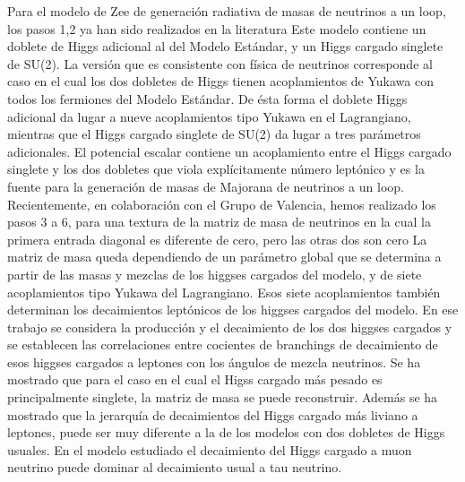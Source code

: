 Para el modelo de Zee de generación radiativa de masas de neutrinos a
un loop, los pasos 1,2 ya han sido realizados en la literatura
Este modelo contiene un doblete de Higgs
adicional al del Modelo Estándar, y un Higgs cargado singlete de
SU(2). La versión que es consistente con física de neutrinos
corresponde al caso en el cual los dos dobletes de Higgs tienen
acoplamientos de Yukawa con todos los fermiones del Modelo Estándar.
De ésta forma el doblete Higgs adicional da lugar a nueve
acoplamientos tipo Yukawa en el Lagrangiano, mientras que el Higgs
cargado singlete de SU(2) da lugar a tres parámetros adicionales. El
potencial escalar contiene un acoplamiento entre el Higgs cargado
singlete y los dos dobletes que viola explícitamente número leptónico
y es la fuente para la generación de masas de Majorana de neutrinos a
un loop. Recientemente, en colaboración con el Grupo de Valencia,
hemos realizado los pasos 3 a 6, para una textura de la matriz de masa
de neutrinos en la cual la primera entrada diagonal es diferente de
cero, pero las otras dos son cero %
La
matriz de masa queda dependiendo de un parámetro global que se
determina a partir de las masas y mezclas de los higgses cargados del
modelo, y de siete acoplamientos tipo Yukawa del Lagrangiano. Esos
siete acoplamientos también determinan los decaimientos leptónicos de
los higgses cargados del modelo. En ese trabajo se considera la
producción y el decaimiento de los dos higgses cargados y se
establecen las correlaciones entre cocientes de branchings de
decaimiento de esos higgses cargados a leptones con los ángulos de
mezcla neutrinos. Se ha mostrado que para el caso en el cual el Higss
cargado más pesado es principalmente singlete, la matriz de masa se
puede reconstruir. Además se ha mostrado que la jerarquía de
decaimientos del Higgs cargado más liviano a leptones, puede ser muy
diferente a la de los modelos con dos dobletes de Higgs usuales.  En
el modelo estudiado el decaimiento del Higgs cargado a muon neutrino
puede dominar al decaimiento usual a tau neutrino.

